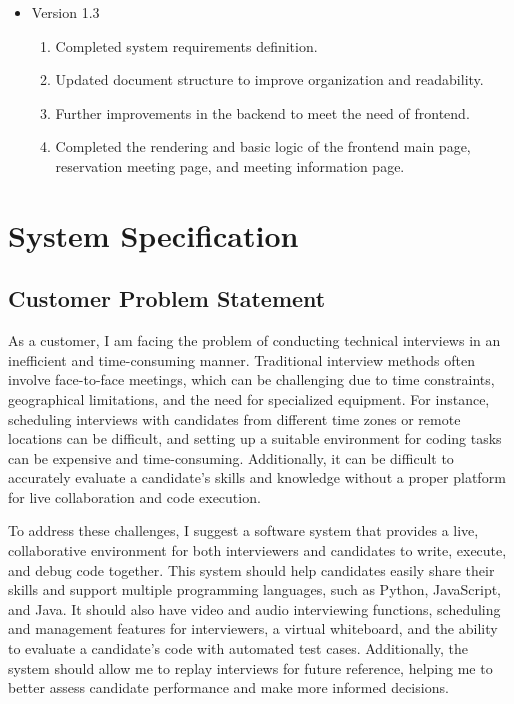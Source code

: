 \documentclass{article}
\begin{document}
\begin{itemize}
    \item Version 1.3
    \begin{enumerate}
        \item Completed system requirements definition.
        \item Updated document structure to improve organization and readability.
        \item Further improvements in the backend to meet the need of frontend.
        \item Completed the rendering and basic logic of the frontend main page, reservation meeting page, and meeting information page.
    \end{enumerate}
\end{itemize}


\section{System Specification}
\subsection{Customer Problem Statement}

As a customer, I am facing the problem of conducting technical interviews in an inefficient and time-consuming manner. Traditional interview methods often involve face-to-face meetings, which can be challenging due to time constraints, geographical limitations, and the need for specialized equipment. For instance, scheduling interviews with candidates from different time zones or remote locations can be difficult, and setting up a suitable environment for coding tasks can be expensive and time-consuming. Additionally, it can be difficult to accurately evaluate a candidate’s skills and knowledge without a proper platform for live collaboration and code execution.

To address these challenges, I suggest a software system that provides a live, collaborative environment for both interviewers and candidates to write, execute, and debug code together. This system should help candidates easily share their skills and support multiple programming languages, such as Python, JavaScript, and Java. It should also have video and audio interviewing functions, scheduling and management features for interviewers, a virtual whiteboard, and the ability to evaluate a candidate’s code with automated test cases. Additionally, the system should allow me to replay interviews for future reference, helping me to better assess candidate performance and make more informed decisions.
\end{document}
